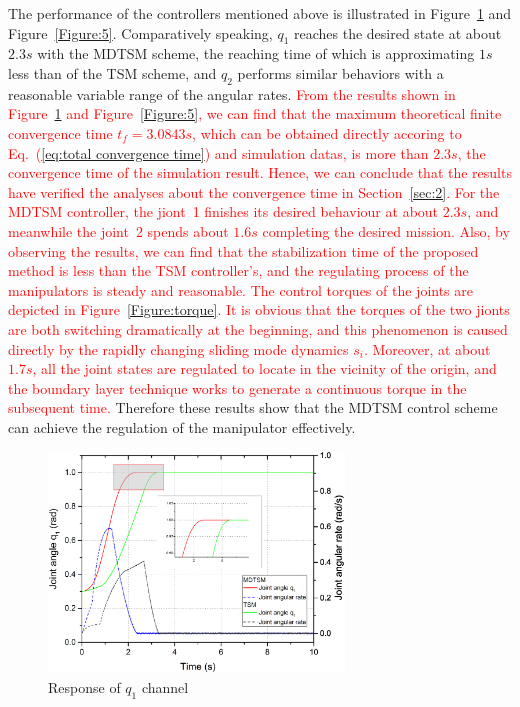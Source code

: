 \documentclass[3p]{elsarticle}
\theoremstyle{plain}
\theoremstyle{remark}
\begin{document}
The performance of the controllers mentioned above is illustrated in Figure~\ref{Figure:4} and Figure~\ref{Figure:5}. Comparatively speaking, $q_1$ reaches the desired state at about $2.3s$ with the MDTSM scheme, the reaching time of which is approximating $1s$ less than of the TSM scheme, and $q_2$ performs similar behaviors with a reasonable variable range of the angular rates. \textcolor{red}{From the results shown in Figure~\ref{Figure:4} and Figure~\ref{Figure:5}, we can find that the maximum theoretical finite convergence time $t_f=3.0843s$, which can be obtained directly accoring to Eq.~(\ref{eq:total convergence time}) and simulation datas, is more than $2.3s$, the convergence time of the simulation result. Hence, we can conclude that the results have verified the analyses about the convergence time in Section~\ref{sec:2}. For the MDTSM controller, the jiont~1 finishes its desired behaviour at about $2.3s$, and meanwhile the joint~2 spends about $1.6s$ completing the desired mission. Also, by observing the results, we can find that the stabilization time of the proposed method is less  than the TSM controller's, and the regulating process of the manipulators is steady and reasonable. The control torques of the joints are depicted in Figure~\ref{Figure:torque}. It is obvious that the torques of the two jionts are both switching dramatically at the beginning, and this phenomenon is caused directly by the rapidly changing sliding mode dynamics $s_i$. Moreover, at about $1.7s$, all the joint states are regulated to locate in the vicinity of the origin, and the boundary layer technique works to generate a continuous torque in the subsequent time.} Therefore these results show that the MDTSM control scheme can achieve the regulation of the manipulator effectively.
\begin{figure}
\centering
\includegraphics[width=0.7\textwidth]{paper3_fig4.eps}
\caption{Response of $q_1$ channel}
\label{Figure:4}
\end{figure}
\end{document}
